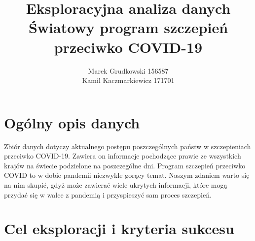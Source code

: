 \documentclass[12pt, oneside, openany]{article}
\title{
	Eksploracyjna analiza danych \\
	Światowy program szczepień przeciwko COVID-19
}
\author{
	Marek Grudkowski 156587
	\\
	Kamil Kaczmarkiewicz 171701
}
\begin{document}
\maketitle

\section{Ogólny opis danych}

Zbiór danych dotyczy aktualnego postępu poszczególnych państw w szczepieniach przeciwko COVID-19. Zawiera on informacje pochodzące prawie ze wszystkich krajów na świecie podzielone na poszczególne dni. Program szczepień przeciwko COVID to w dobie pandemii niezwykle gorący temat. Naszym zdaniem warto się na nim skupić, gdyż może zawierać wiele ukrytych informacji, które mogą przydać się w walce z pandemią i przyspieszyć sam proces szczepień. 

\section{Cel eksploracji i kryteria sukcesu}

\newpage
\end{document}
